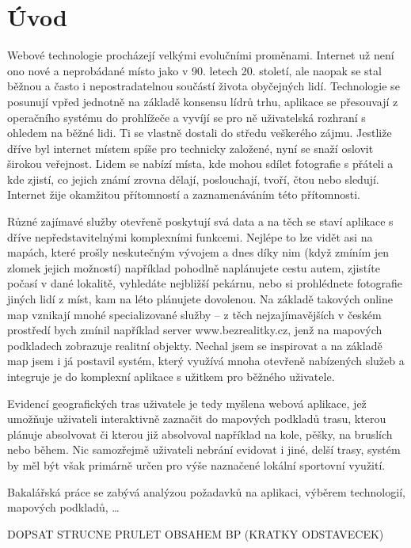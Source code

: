 \chapter*{Úvod}

Webové technologie procházejí velkými evolučními proměnami. Internet
už není ono nové a neprobádané místo jako v 90. letech 20.
století, ale naopak se stal běžnou a často i nepostradatelnou
součástí života obyčejných lidí. Technologie se posunují vpřed
jednotně na základě konsensu lídrů trhu, aplikace se přesouvají z
operačního systému do prohlížeče a vyvíjí se pro ně uživatelská
rozhraní s ohledem na běžné lidi. Ti se vlastně dostali do středu
veškerého zájmu. Jestliže dříve byl internet místem spíše pro
technicky založené, nyní se snaží oslovit širokou veřejnost. Lidem se
nabízí místa, kde mohou sdílet fotografie s přáteli a kde zjistí, co
jejich známí zrovna dělají, poslouchají, tvoří, čtou nebo sledují. Internet žije
okamžitou přítomností a zaznamenáváním této přítomnosti.

Různé zajímavé služby otevřeně poskytují svá data a na těch se staví
aplikace s dříve nepředstavitelnými komplexními funkcemi. Nejlépe to lze vidět
asi na mapách, které prošly neskutečným vývojem a dnes díky nim (když
zmíním jen zlomek jejich možností) například pohodlně naplánujete
cestu autem, zjistíte počasí v dané lokalitě, vyhledáte nejbližší
pekárnu, nebo si prohlédnete fotografie jiných lidí z míst, kam na
léto plánujete dovolenou. Na základě takových online map vznikají
mnohé specializované služby -- z těch nejzajímavějších v českém
prostředí bych zmínil například server www.bezrealitky.cz, jenž na
mapových podkladech zobrazuje realitní objekty. Nechal jsem se
inspirovat a na základě map jsem i já postavil systém, který využívá
mnoha otevřeně nabízených služeb a integruje je do komplexní aplikace
s užitkem pro běžného uživatele.

Evidencí geografických tras uživatele je tedy myšlena webová aplikace,
jež umožňuje uživateli interaktivně zaznačit do mapových podkladů trasu,
kterou plánuje absolvovat či kterou již absolvoval například na kole,
pěšky, na bruslích nebo během. Nic samozřejmě uživateli nebrání
evidovat i jiné, delší trasy, systém by měl být však primárně určen
pro výše naznačené lokální sportovní využití.

Bakalářská práce se zabývá analýzou požadavků na aplikaci, výběrem
technologií, mapových podkladů, \ldots

DOPSAT STRUCNE PRULET OBSAHEM BP (KRATKY ODSTAVECEK)

